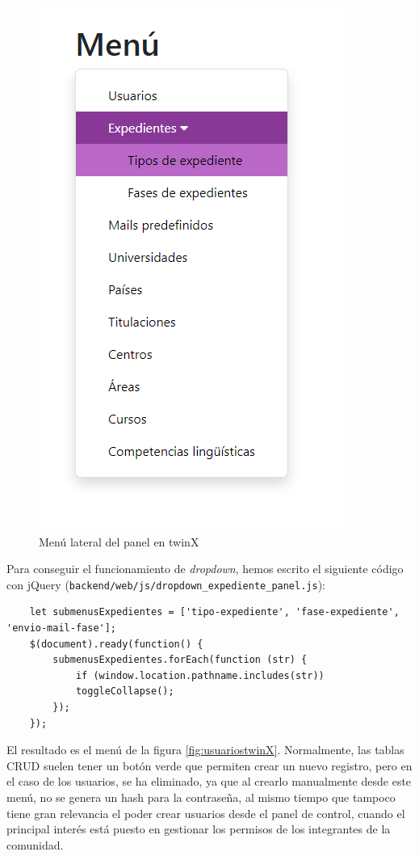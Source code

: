 \begin{figure}
	\centering
	\includegraphics[height=0.4\textheight]{Capturas de twinX/sidebar_panel}
	\caption{Menú lateral del panel en twinX}
	\label{fig:sidebarpaneltwinX}
\end{figure}

Para conseguir el funcionamiento de \textit{dropdown}, hemos escrito el siguiente código con jQuery (\texttt{backend/web/js/dropdown\_expediente\_panel.js}):

\begin{verbatim}
	let submenusExpedientes = ['tipo-expediente', 'fase-expediente', 'envio-mail-fase'];
	$(document).ready(function() {
		submenusExpedientes.forEach(function (str) {
			if (window.location.pathname.includes(str))
			toggleCollapse();
		});
	});
\end{verbatim}

El resultado es el menú de la figura \ref{fig:usuariostwinX}. Normalmente, las tablas CRUD suelen tener un botón verde que permiten crear un nuevo registro, pero en el caso de los usuarios, se ha eliminado, ya que al crearlo manualmente desde este menú, no se genera un hash para la contraseña, al mismo tiempo que tampoco tiene gran relevancia el poder crear usuarios desde el panel de control, cuando el principal interés está puesto en gestionar los permisos de los integrantes de la comunidad.

